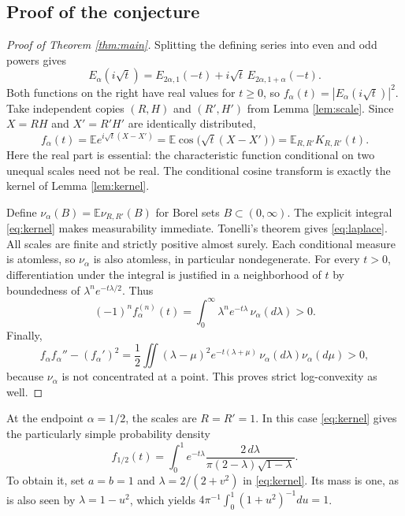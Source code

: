 \documentclass[11pt]{article}
\newcommand{\E}{\mathbb E}
\begin{document}
\subsection*{Proof of the conjecture}
\begin{proof}[Proof of Theorem \ref{thm:main}]
Splitting the defining series into even and odd powers gives
\[
 E_\alpha(i\sqrt t)=E_{2\alpha,1}(-t)
                +i\sqrt t\,E_{2\alpha,1+\alpha}(-t).
\]
Both functions on the right have real values for $t\geq0$, so
$f_\alpha(t)=|E_\alpha(i\sqrt t)|^2$.
Take independent copies $(R,H)$ and $(R',H')$ from Lemma \ref{lem:scale}.
Since $X=RH$ and $X'=R'H'$ are identically distributed,
\[
 f_\alpha(t)=\E e^{i\sqrt t(X-X')}
            =\E\cos\bigl(\sqrt t(X-X')\bigr)
            =\E_{R,R'}K_{R,R'}(t).
\]
Here the real part is essential: the characteristic function conditional
on two unequal scales need not be real. The conditional cosine transform
is exactly the kernel of Lemma \ref{lem:kernel}.

Define $\nu_\alpha(B)=\E\nu_{R,R'}(B)$ for Borel sets
$B\subset(0,\infty)$. The explicit integral \eqref{eq:kernel} makes
measurability immediate. Tonelli's theorem gives \eqref{eq:laplace}.
All scales are finite and strictly positive almost surely. Each
conditional measure is atomless, so $\nu_\alpha$ is also atomless,
in particular nondegenerate.
For every $t>0$, differentiation under the integral is justified in a
neighborhood of $t$ by boundedness of $\lambda^n e^{-t\lambda/2}$.
Thus
\[
 (-1)^n f_\alpha^{(n)}(t)
  =\int_0^\infty\lambda^n e^{-t\lambda}\,\nu_\alpha(d\lambda)>0.
\]
Finally,
\[
 f_\alpha f_\alpha''-(f_\alpha')^2
 =\frac12\iint(\lambda-\mu)^2e^{-t(\lambda+\mu)}
       \,\nu_\alpha(d\lambda)\nu_\alpha(d\mu)>0,
\]
because $\nu_\alpha$ is not concentrated at a point. This proves strict
log-convexity as well.
\end{proof}

At the endpoint $\alpha=1/2$, the scales are $R=R'=1$. In this case
\eqref{eq:kernel} gives the particularly simple probability density
\begin{equation}\label{eq:endpoint}
 f_{1/2}(t)=\int_0^1
     e^{-t\lambda}\frac{2\,d\lambda}{\pi(2-\lambda)\sqrt{1-\lambda}}.
\end{equation}
To obtain it, set $a=b=1$ and $\lambda=2/(2+v^2)$ in
\eqref{eq:kernel}. Its mass is one, as is also seen by
$\lambda=1-u^2$, which yields $4\pi^{-1}\int_0^1(1+u^2)^{-1}du=1$.
\end{document}
